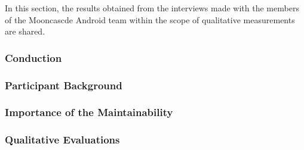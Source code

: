 In this section, the results obtained from the interviews made with the members of the Mooncascde Android team within the scope of qualitative measurements are shared.

\subsubsection{Conduction}


\subsubsection{Participant Background}


\subsubsection{Importance of the Maintainability}


\subsubsection{Qualitative Evaluations}

